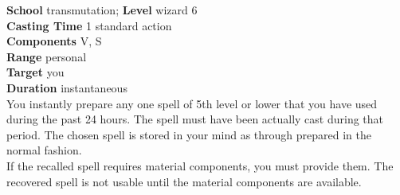 \textbf{School} transmutation; \textbf{Level }wizard 6\\
\textbf{Casting Time} 1 standard action\\
\textbf{Components} V, S\\
\textbf{Range} personal\\
\textbf{Target} you\\
\textbf{Duration} instantaneous\\
You instantly prepare any one spell of 5th level or lower that you have used during the past 24 hours. The spell must have been actually cast during that period. The chosen spell is stored in your mind as through prepared in the normal fashion.\\
If the recalled spell requires material components, you must provide them. The recovered spell is not usable until the material components are available.\\

